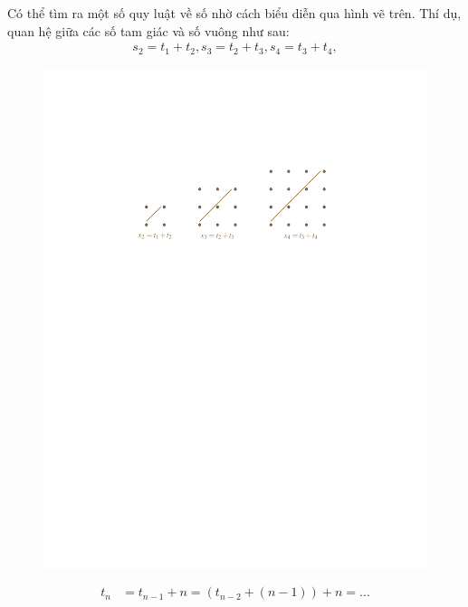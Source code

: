 \begin{multicols}{2}
\begin{figure}[H]
		\vspace*{-25pt}
	\end{figure}
	Có thể tìm ra một số quy luật về số nhờ cách biểu diễn qua hình vẽ trên. Thí dụ, quan hệ giữa các số tam giác và số vuông như sau:
	\setlength{\abovedisplayskip}{4pt}
	\setlength{\belowdisplayskip}{4pt}
	\begin{align*}
		s_2 = t_1 + t_2, s_3 = t_2 + t_3, s_4 = t_3 + t_4,
	\end{align*}
	\begin{figure}[H]
		\vspace*{-15pt}
		\centering
		\captionsetup{labelformat= empty, justification=centering}
		\includegraphics[width= 1\linewidth]{7.pdf}
		\vspace*{-25pt}
	\end{figure}
	\begin{align*}
			{t_n} &= {t_{n - 1}} + n = \left( {{t_{n - 2}} + \left( {n - 1} \right)} \right) + n = ...\\

\end{align*}
\end{multicols}

